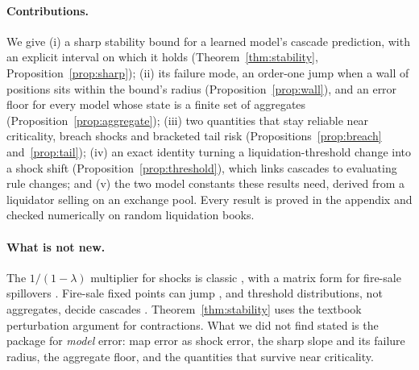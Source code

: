 \documentclass[letterpaper]{article} %
\theoremstyle{remark}
\begin{document}
\paragraph{Contributions.} We give
(i) a sharp stability bound for a learned model's cascade prediction, with an explicit interval on which it holds (Theorem~\ref{thm:stability}, Proposition~\ref{prop:sharp});
(ii) its failure mode, an order-one jump when a wall of positions sits within the bound's radius (Proposition~\ref{prop:wall}), and an error floor for every model whose state is a finite set of aggregates (Proposition~\ref{prop:aggregate});
(iii) two quantities that stay reliable near criticality, breach shocks and bracketed tail risk (Propositions~\ref{prop:breach} and~\ref{prop:tail});
(iv) an exact identity turning a liquidation-threshold change into a shock shift (Proposition~\ref{prop:threshold}), which links cascades to evaluating rule changes; and
(v) the two model constants these results need, derived from a liquidator selling on an exchange pool.
Every result is proved in the appendix and checked numerically on random liquidation books.

\paragraph{What is not new.} The $1/(1-\lambda)$ multiplier for shocks is classic \citep{brunnermeier2009liquidity}, with a matrix form for fire-sale spillovers \citep{greenwood2015vulnerable}. Fire-sale fixed points can jump \citep{cifuentes2005liquidity,cao2023pricemediated}, and threshold distributions, not aggregates, decide cascades \citep{granovetter1978threshold,onaga2022firesales}. Theorem~\ref{thm:stability} uses the textbook perturbation argument for contractions. What we did not find stated is the package for \emph{model} error: map error as shock error, the sharp slope and its failure radius, the aggregate floor, and the quantities that survive near criticality.
\end{document}
